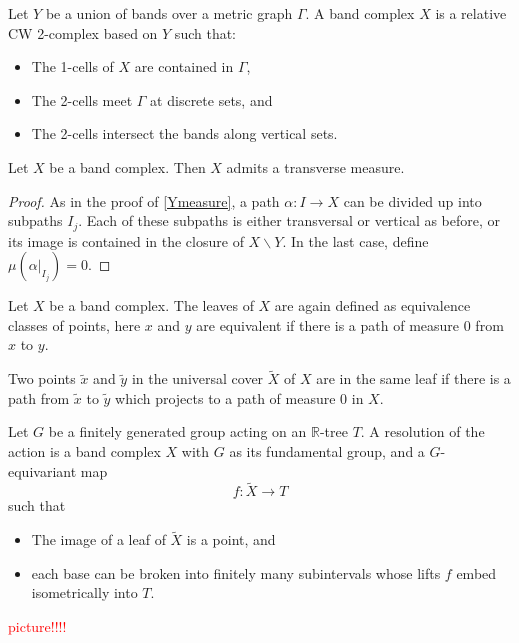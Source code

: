\begin{definition}
    Let $Y$ be a union of bands over a metric graph $\Gamma$. A \textnormal{band complex} $X$ is a relative CW 2-complex based on $Y$ such that:
    \begin{itemize}
        \item The 1-cells of $X$ are contained in $\Gamma$,
        \item The 2-cells meet $\Gamma$ at discrete sets, and
        \item The 2-cells intersect the bands along vertical sets.
    \end{itemize}
\end{definition}

\begin{lemma}
    Let $X$ be a band complex. Then $X$ admits a transverse measure. 
\end{lemma}
\begin{proof}
    As in the proof of \ref{Ymeasure}, a path $\alpha:I\rightarrow X$ can be divided up into subpaths $I_j$. Each of these subpaths is either transversal or vertical as before, or its image is contained in the closure of $X\backslash Y$. In the last case, define $\mu(\alpha\vert_{I_j})=0$.
\end{proof}

Let $X$ be a band complex. The leaves of $X$ are again defined as equivalence classes of points, here $x$ and $y$ are equivalent if there is a path of measure 0 from $x$ to $y$. 

Two points $\tilde{x}$ and $\tilde{y}$ in the universal cover $\tilde{X}$ of $X$ are in the same leaf if there is a path from $\tilde{x}$ to $\tilde{y}$ which projects to a path of measure 0 in $X$. 

\begin{definition}
    Let $G$ be a finitely generated group acting on an $\mathbb{R}$-tree $T$. A \textnormal{resolution} of the action is a band complex $X$ with $G$ as its fundamental group, and a $G$-equivariant map \[f:\tilde{X}\rightarrow T\] such that 
    \begin{itemize}
        \item The image of a leaf of $\tilde{X}$ is a point, and
        \item each base can be broken into finitely many subintervals whose lifts $f$ embed isometrically into $T$.
    \end{itemize}
\end{definition}
\textcolor{red}{picture!!!!}


